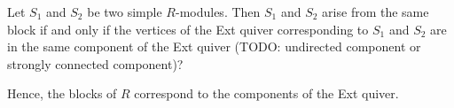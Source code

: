 Let $S_1$  and $S_2$ be two simple $R$-modules. Then $S_1$ and $S_2$ arise from
the same block if and only if the vertices of the Ext quiver corresponding to
$S_1$ and $S_2$ are in the same component of the Ext quiver (TODO: undirected
component or strongly connected component)?

Hence, the blocks of $R$ correspond to the components of the Ext quiver.
